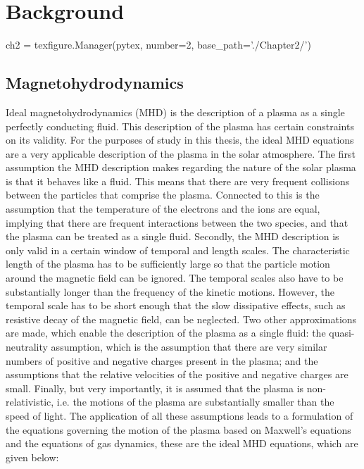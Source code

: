 \chapter{Background}\label{ch:background}  %

\begin{pycode}[chapter2]
ch2 = texfigure.Manager(pytex, number=2, base_path='./Chapter2/')
\end{pycode}
	

\section{Magnetohydrodynamics}\label{sec:MHD}

Ideal magnetohydrodynamics (MHD) is the description of a plasma as a single perfectly conducting fluid.
This description of the plasma has certain constraints on its validity.
For the purposes of study in this thesis, the ideal MHD equations are a very applicable description of the plasma in the solar atmosphere.
The first assumption the MHD description makes regarding the nature of the solar plasma is that it behaves like a fluid.
This means that there are very frequent collisions between the particles that comprise the plasma.
Connected to this is the assumption that the temperature of the electrons and the ions are equal, implying that there are frequent interactions between the two species, and that the plasma can be treated as a single fluid.
Secondly, the MHD description is only valid in a certain window of temporal and length scales.
The characteristic length of the plasma has to be sufficiently large so that the particle motion around the magnetic field can be ignored.
The temporal scales also have to be substantially longer than the frequency of the kinetic motions.
However, the temporal scale has to be short enough that the slow dissipative effects, such as resistive decay of the magnetic field, can be neglected.
Two other approximations are made, which enable the description of the plasma as a single fluid: the quasi-neutrality assumption, which is the assumption that there are very similar numbers of positive and negative charges present in the plasma; and the assumptions that the relative velocities of the positive and negative charges are small.
Finally, but very importantly, it is assumed that the plasma is non-relativistic, i.e. the motions of the plasma are substantially smaller than the speed of light.
The application of all these assumptions leads to a formulation of the equations governing the motion of the plasma based on Maxwell's equations and the equations of gas dynamics, these are the ideal MHD equations, which are given below:
\newcommand{\condev}{\left(\frac{\partial}{\partial t} + \vec{v}\cdot\nabla\right)}


